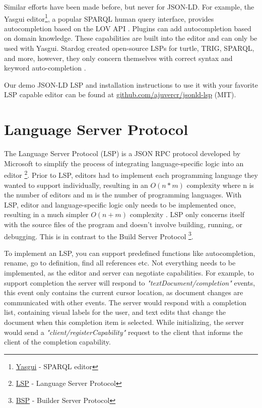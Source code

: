 \documentclass[
]{ceurart}
\begin{document}
Similar efforts have been made before, but never for JSON-LD. For example, the Yasgui editor\footnote{\href{https://triply.cc/docs/yasgui/}{Yasgui} - SPARQL editor}, a popular SPARQL human query interface, provides autocompletion based on the LOV API \cite{LOV}. Plugins can add autocompletion based on domain knowledge. These capabilities are built into the editor and can only be used with Yasgui.
Stardog created open-source LSPs for turtle, TRIG, SPARQL, and more, however, they only concern themselves with correct syntax and keyword auto-completion \cite{stardog}. 

Our demo JSON-LD LSP and installation instructions to use it with your favorite LSP capable editor can be found at \href{github.com/ajuvercr/jsonld-lsp](https://github.com/ajuvercr/jsonld-lsp}{github.com/ajuvercr/jsonld-lsp} (MIT).


\section{Language Server Protocol}

The Language Server Protocol (LSP) is a JSON RPC protocol developed by Microsoft to simplify the process of integrating language-specific logic into an editor \footnote{\href{https://microsoft.github.io/language-server-protocol/}{LSP} - Language Server Protocol}. 
Prior to LSP, editors had to implement each programming language they wanted to support individually, resulting in an \(O(n*m)\) complexity where n is the number of editors and m is the number of programming languages.
With LSP, editor and language-specific logic only needs to be implemented once, resulting in a much simpler \(O(n+m)\) complexity \cite{LSP-Multi}.
LSP only concerns itself with the source files of the program and doesn't involve building, running, or debugging.
This is in contrast to the Build Server Protocol \footnote{\href{https://github.com/build-server-protocol/build-server-protocol}{BSP} - Builder Server Protocol}.

To implement an LSP, you can support predefined functions like autocompletion, rename, go to definition, find all references etc. Not everything needs to be implemented, as the editor and server can negotiate capabilities. For example, to support completion the server will respond to \textit{"textDocument/completion"} events, this event only contains the current cursor location, as document changes are communicated with other events. The server would respond with a completion list, containing visual labels for the user, and text edits that change the document when this completion item is selected. While initializing, the server would send a \textit{"client/registerCapability"} request to the client that informs the client of the completion capability. 
\end{document}
